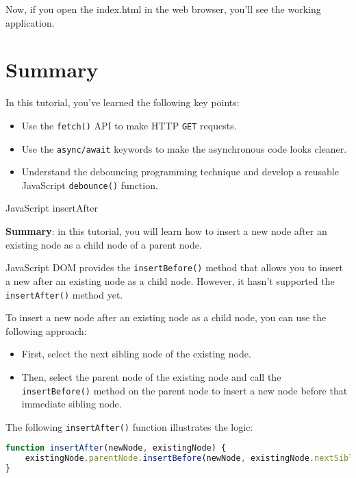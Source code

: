 \documentclass[11pt]{article}
\newenvironment{displayquote} %
{\begin{shaded*}\noindent
\quoting[leftmargin=0pt, vskip=0pt]
}
 {\endquoting
 \end{shaded*}
}
\begin{document}
\noindent
Now, if you open the index.html in the web browser, you'll see the
working application.

\section*{Summary}

In this tutorial, you've learned the following key points:
\begin{itemize}
\item Use the \verb|fetch()| API to make HTTP \verb|GET| requests.
\item Use the \verb|async/await| keywords to make the asynchronous code
looks cleaner.
\item Understand the debouncing programming technique and develop a
reusable JavaScript \verb|debounce()| function.
\end{itemize}
\newpage

\noindent
{}
{\huge JavaScript insertAfter}

\begin{displayquote}
\textbf{Summary}: in this tutorial, you will learn how to insert a
new node after an existing node as a child node of a parent node.
\end{displayquote}

\noindent
JavaScript DOM provides the \verb|insertBefore()| method that allows
you to insert a new after an existing node as a child node.
However, it hasn't supported the \verb|insertAfter()| method yet.
\newline

\noindent
To insert a new node after an existing node as a child node,
you can use the following approach:
\begin{itemize}
\item First, select the next sibling node of the existing node.
\item Then, select the parent node of the existing node and call
the \verb|insertBefore()| method on the parent node to insert a new node
before that immediate sibling node.
\end{itemize}
\noindent
The following \verb|insertAfter()| function illustrates the logic:

\begin{lstlisting}[language=JavaScript]
function insertAfter(newNode, existingNode) {
    existingNode.parentNode.insertBefore(newNode, existingNode.nextSibling);
}
\end{lstlisting}
\end{document}
